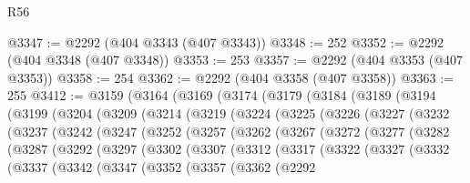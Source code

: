 \begin{lexlean}{R56}
\begin{coremodule}
@3347 := @2292 (@404 @3343 (@407 @3343))
@3348 := 252
@3352 := @2292 (@404 @3348 (@407 @3348))
@3353 := 253
@3357 := @2292 (@404 @3353 (@407 @3353))
@3358 := 254
@3362 := @2292 (@404 @3358 (@407 @3358))
@3363 := 255
@3412 := @3159
    (@3164
      (@3169
        (@3174
          (@3179
            (@3184
              (@3189
                (@3194
                  (@3199
                    (@3204
                      (@3209
                        (@3214
                          (@3219
                            (@3224
                              (@3225
                                (@3226
                                  (@3227
                                    (@3232
                                      (@3237
                                        (@3242
                                          (@3247
                                            (@3252
                                              (@3257
                                                (@3262
                                                  (@3267
                                                    (@3272
                                                      (@3277
                                                        (@3282
                                                          (@3287
                                                            (@3292
                                                              (@3297
                                                                (@3302
                                                                  (@3307
                                                                    (@3312
                                                                      (@3317
                                                                        (@3322
                                                                          (@3327
                                                                            (@3332
                                                                              (@3337
                                                                                (@3342
                                                                                  (@3347
                                                                                    (@3352
                                                                                      (@3357
                                                                                        (@3362
                                                                                          (@2292

\end{coremodule}
\end{lexlean}
